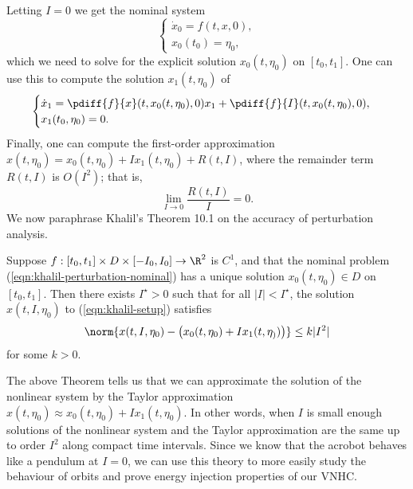 Letting \(I = 0\) we get the nominal system
\begin{equation}\label{eqn:khalil-perturbation-nominal}
    \begin{cases}
        \dot{x}_0 = f(t,x,0) ,\\
        x_0(t_0) = \eta_0 ,
    \end{cases}
\end{equation}
which we need to solve for the explicit solution \(x_0(t,\eta_0)\) on \([t_0,t_1]\).
One can use this to compute the solution \(x_1(t,\eta_0)\) of
\begin{equation}\label{eqn:khalil-perturbation-firstorder}
    \begin{cases}
        \dot{x}_1 = \pdiff{f}{x}(t,x_0(t,\eta_0),0)x_1 + \pdiff{f}{I}(t,x_0(t,\eta_0),0)
        , \\
        x_1(t_0,\eta_0) = 0
        .
    \end{cases}
\end{equation}
Finally, one can compute the first-order approximation
\(x(t,\eta_0) = x_0(t,\eta_0) + I x_1(t,\eta_0) + R(t,I)\), where the remainder
term \(R(t,I)\) is \(O(I^2)\);
that is,
\[
    \lim \limits_{I \to 0} \frac{R(t,I)}{I} = 0
    .
\]
We now paraphrase Khalil's Theorem 10.1 \cite{khalil_nonlinear} on the
accuracy of perturbation analysis.
\begin{thm}
    Suppose \(f : [t_0,t_1] \times D \times [-I_0,I_0] \rightarrow \R^2\) is
    \(C^1\), and that the nominal problem (\ref{eqn:khalil-perturbation-nominal}) has a
    unique solution \(x_0(t,\eta_0) \in D\) on \([t_0,t_1]\).
    Then there exists \(I^\star > 0\) such that for all \(|I| < I^\star\), the
    solution \(x(t,I,\eta_0)\) to (\ref{eqn:khalil-setup}) satisfies
    \[
        \norm{x(t,I,\eta_0) - \left(x_0(t,\eta_0) + I x_1(t,\eta_))\right)} \leq k |I^2|
    \]
    for some \(k > 0\).
\end{thm}

The above Theorem tells us that we can approximate the solution of the nonlinear
system by the Taylor approximation 
\(x(t,\eta_0) \approx x_0(t,\eta_0) + I x_1(t,\eta_0)\).
In other words, when \(I\) is small enough solutions of the nonlinear system and
the Taylor approximation are the same up to order \(I^2\) along compact time
intervals.
Since we know that the acrobot behaves like a pendulum at \(I = 0\), we can
use this theory to more easily study the behaviour of orbits and prove energy
injection properties of our VNHC.
 
